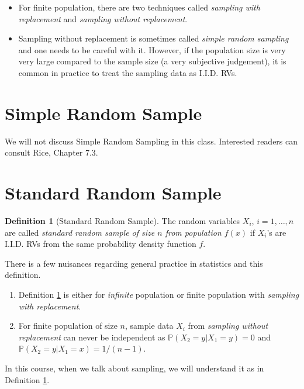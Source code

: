 \documentclass[
  openany]{book}
\theoremstyle{definition}
\newtheorem{definition}{Definition}[chapter]
\theoremstyle{definition}
\theoremstyle{definition}
\theoremstyle{definition}
\theoremstyle{remark}
\begin{document}
\begin{itemize}
\item
  For finite population, there are two techniques called \emph{sampling with replacement} and
  \emph{sampling without replacement}.
\item
  Sampling without replacement is sometimes called \emph{simple random sampling} and
  one needs to be careful with it. However, if the population size is very very large
  compared to the sample size (a very subjective judgement),
  it is common in practice to treat the sampling data as I.I.D. RVs.
\end{itemize}

\section{Simple Random Sample}\label{simple-random-sample}

We will not discuss Simple Random Sampling in this class.
Interested readers can consult Rice, Chapter 7.3.

\section{Standard Random Sample}\label{standard-random-sample}

\begin{definition}[Standard Random Sample]
\protect\hypertarget{def:stdSample}{}\label{def:stdSample}The random variables \(X_i\), \(i = 1,\dots , n\) are called \emph{standard random sample of
size \(n\) from population \(f(x)\)} if \(X_i\)'s are I.I.D. RVs from the same
probability density function \(f\).
\end{definition}

There is a few nuisances regarding general practice in statistics and this definition.

\begin{enumerate}
\def\labelenumi{\arabic{enumi}.}
\item
  Definition \ref{def:stdSample} is either for \emph{infinite} population or finite population with \emph{sampling with replacement}.
\item
  For finite population of size \(n\), sample data \(X_i\) from \emph{sampling without replacement}
  can never be independent as
  \(\mathbb{P}(X_2 = y | X_1 = y) = 0\) and \(\mathbb{P}(X_2 = y | X_1 = x) = 1/(n-1)\).
\end{enumerate}

In this course, when we talk about sampling, we will understand it as in Definition \ref{def:stdSample}.
\end{document}
